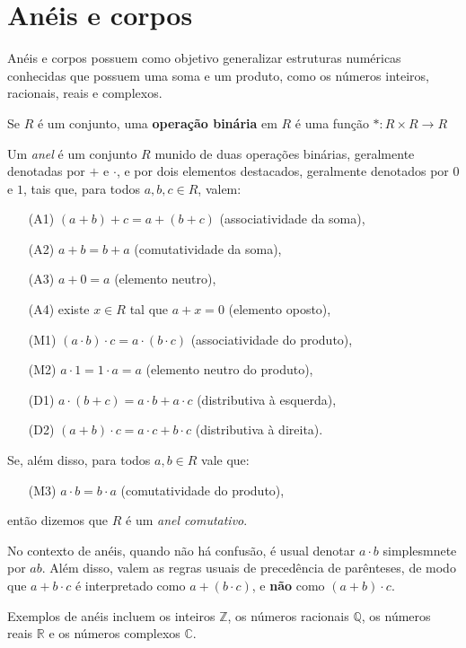 \section{Anéis e corpos}

Anéis e corpos possuem como objetivo generalizar estruturas numéricas conhecidas que possuem uma soma e um produto, como os números inteiros, racionais, reais e complexos.

Se $R$ é um conjunto, uma \textbf{operação binária} em $R$ é uma função $*: R \times R \to R$ 
\begin{definition}
Um \emph{anel}  é um conjunto $R$ munido de duas operações binárias, geralmente denotadas por $+$ e $\cdot$, e por dois elementos destacados, geralmente denotados por $0$ e $1$, tais que, para todos $a, b, c \in R$, valem:
\begin{itemize}
    \item[(A1)] $(a+b)+c = a+(b+c)$ (associatividade da soma),
    \item[(A2)] $a+b = b+a$ (comutatividade da soma),
    \item[(A3)] $a+0=a$ (elemento neutro),
    \item[(A4)] existe $x \in R$ tal que $a+x=0$ (elemento oposto),
    \item[(M1)] $(a\cdot b)\cdot c = a\cdot(b\cdot c)$ (associatividade do produto),
    \item[(M2)] $a\cdot 1=1\cdot a=a$ (elemento neutro do produto),
    \item[(D1)] $a\cdot(b+c)=a\cdot b+a\cdot c$ (distributiva à esquerda),
    \item[(D2)] $(a+b)\cdot c=a\cdot c+b\cdot c$ (distributiva à direita).
\end{itemize}

Se, além disso, para todos $a, b \in R$ vale que:
\begin{itemize}
    \item[(M3)] $a\cdot b = b\cdot a$ (comutatividade do produto),
\end{itemize}
então dizemos que $R$ é um \emph{anel comutativo}.
\end{definition}

No contexto de anéis, quando não há confusão, é usual denotar $a\cdot b$ simplesmnete por $ab$.
Além disso, valem as regras usuais de precedência de parênteses, de modo que $a+b\cdot c$ é interpretado como $a+(b\cdot c)$, e \textbf{não} como $(a+b)\cdot c$.

Exemplos de anéis incluem os inteiros $\mathbb{Z}$, os números racionais $\mathbb{Q}$, os números reais $\mathbb{R}$ e os números complexos $\mathbb{C}$.

